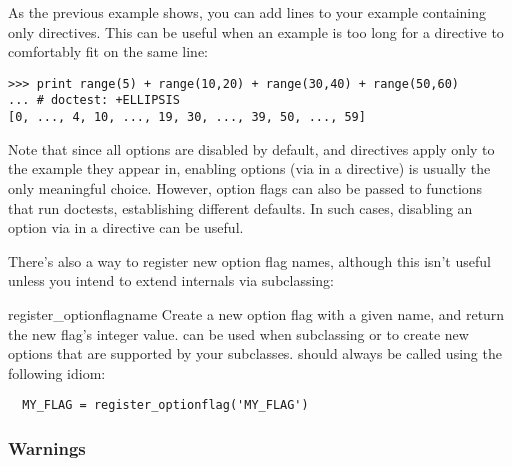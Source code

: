 As the previous example shows, you can add  lines to your
example containing only directives.  This can be useful when an
example is too long for a directive to comfortably fit on the same
line:

\begin{verbatim}
>>> print range(5) + range(10,20) + range(30,40) + range(50,60)
... # doctest: +ELLIPSIS
[0, ..., 4, 10, ..., 19, 30, ..., 39, 50, ..., 59]
\end{verbatim}

Note that since all options are disabled by default, and directives apply
only to the example they appear in, enabling options (via \code{+} in a
directive) is usually the only meaningful choice.  However, option flags
can also be passed to functions that run doctests, establishing different
defaults.  In such cases, disabling an option via \code{-} in a directive
can be useful.


There's also a way to register new option flag names, although this
isn't useful unless you intend to extend  internals
via subclassing:

\begin{funcdesc}{register_optionflag}{name}
  Create a new option flag with a given name, and return the new
  flag's integer value.   can be
  used when subclassing  or
   to create new options that are supported by
  your subclasses.   should always be
  called using the following idiom:

\begin{verbatim}
  MY_FLAG = register_optionflag('MY_FLAG')
\end{verbatim}

\end{funcdesc}

\subsubsection{Warnings\label{doctest-warnings}}

